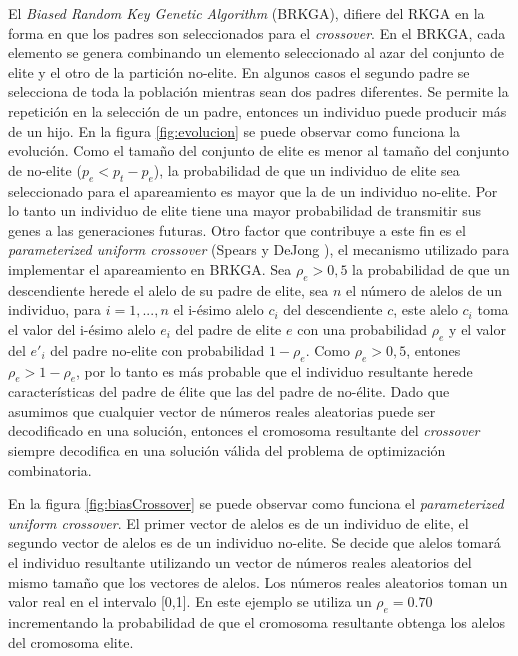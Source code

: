 El \textit{Biased Random Key Genetic Algorithm} (BRKGA), difiere del RKGA en la forma en que los padres son seleccionados para el \textit{crossover}. En el BRKGA, cada elemento se genera combinando un elemento seleccionado al azar del conjunto de elite y el otro de la partición no-elite. En algunos casos el segundo padre se selecciona de toda la población mientras sean dos padres diferentes. Se permite la repetición en la selección de un padre, entonces un individuo puede producir más de un hijo. En la figura \ref{fig:evolucion} se puede observar como funciona la evolución. Como el tamaño del conjunto de elite es menor al tamaño del conjunto de no-elite ($p_e < p_t - p_e$), la probabilidad de que un individuo de elite sea seleccionado para el apareamiento es mayor que la de un individuo no-elite. Por lo tanto un individuo de elite tiene una mayor probabilidad de transmitir sus genes a las generaciones futuras. Otro factor que contribuye a este fin es el \textit{parameterized uniform crossover} (Spears y DeJong \cite{SpearsDeJong}), el mecanismo utilizado para implementar el apareamiento en BRKGA. Sea $\rho_e > 0,5$ la probabilidad de que un descendiente herede el alelo de su padre de elite, sea $n$ el número de alelos de un individuo, para $i =1,...,n$ el i-ésimo alelo $c_i$ del descendiente $c$, este alelo $c_i$ toma el valor del i-ésimo alelo $e_i$ del padre de elite $e$ con una probabilidad $\rho_e$ y el valor del $e'_i$ del padre no-elite con probabilidad $1-\rho_e$. Como $\rho_e > 0,5$, entones $\rho_e > 1 - \rho_e$, por lo tanto es más probable que el individuo resultante herede características del padre de élite que las del padre de no-élite. Dado que asumimos que cualquier vector de números reales aleatorias puede ser decodificado en una solución, entonces el cromosoma resultante del \textit{crossover} siempre decodifica en una solución válida del problema de optimización combinatoria. 

\bigskip

En la figura \ref{fig:biasCrossover} se puede observar como funciona el \textit{parameterized uniform crossover}. El primer vector de alelos es de un individuo de elite, el segundo vector de alelos es de un individuo no-elite. Se decide que alelos tomará el individuo resultante utilizando un vector de números reales aleatorios del mismo tamaño que los vectores de alelos. Los números reales aleatorios toman un valor real en el intervalo [0,1]. En este ejemplo se utiliza un $\rho_e = 0.70$ incrementando la probabilidad de que el cromosoma resultante obtenga los alelos del cromosoma elite.

